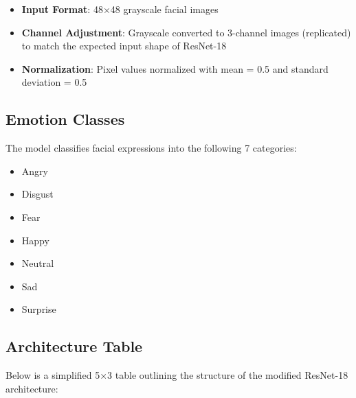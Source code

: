 \documentclass[
  letterpaper,
  DIV=11,
  numbers=noendperiod]{scrreport}
\providecommand{\tightlist}{%
  \setlength{\itemsep}{0pt}\setlength{\parskip}{0pt}}
\begin{document}
\begin{itemize}
\tightlist
\item
  \textbf{Input Format}: 48×48 grayscale facial images
\item
  \textbf{Channel Adjustment}: Grayscale converted to 3-channel images
  (replicated) to match the expected input shape of ResNet-18
\item
  \textbf{Normalization}: Pixel values normalized with mean = 0.5 and
  standard deviation = 0.5
\end{itemize}

\subsection{Emotion Classes}\label{emotion-classes}

The model classifies facial expressions into the following 7 categories:

\begin{itemize}
\tightlist
\item
  Angry
\item
  Disgust
\item
  Fear
\item
  Happy
\item
  Neutral
\item
  Sad
\item
  Surprise
\end{itemize}

\subsection{Architecture Table}\label{architecture-table}

Below is a simplified 5×3 table outlining the structure of the modified
ResNet-18 architecture:
\end{document}
